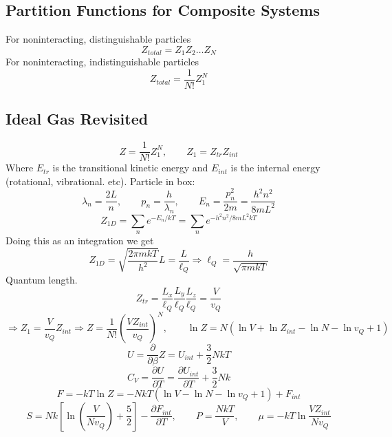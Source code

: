 \documentclass[a4paper,norsk, 10pt]{article}
\begin{document}
\subsection{Partition Functions for Composite Systems}
For noninteracting, distinguishable particles
\begin{equation}
Z_{total} = Z_1Z_2\ldots Z_N
\end{equation}
For noninteracting, indistinguishable particles
\begin{equation}
Z_{total} =\frac{1}{N!} Z_1^N
\end{equation}

\subsection{Ideal Gas Revisited}
\begin{equation}
Z =\frac{1}{N!} Z_1^N, \qquad Z_1 = Z_{tr}Z_{int}
\end{equation}
Where $E_{tr}$ is the transitional kinetic energy and $E_{int}$ is the internal energy (rotational, vibrational. etc). Particle in box:
\begin{equation}
\lambda_n = \frac{2L}{n}, \qquad p_n = \frac{h}{\lambda_n},\qquad E_n = \frac{p_n^2}{2m} = \frac{h^2n^2}{8mL^2}
\end{equation}
\begin{equation}
Z_{1D} = \sum_ne^{-E_n/kT} = \sum_n e^{-h^2n^2/8mL^2kT}
\end{equation}
Doing this as an integration we get
\begin{equation}
Z_{1D} = \sqrt{\frac{2\pi mk T}{h^2}}L = \frac{L}{\ell_Q} \Rightarrow \ell_Q = \frac{h}{\sqrt{\pi mkT}} 
\end{equation}
Quantum length.
\begin{equation}
Z_{tr} = \frac{L_x}{\ell_Q}\frac{L_y}{\ell_Q}\frac{L_z}{\ell_Q} = \frac{V}{v_Q}
\end{equation}
\begin{equation}
\Rightarrow Z_1 = \frac{V}{v_Q}Z_{int}\Rightarrow Z = \frac{1}{N!}\left(\frac{VZ_{int}}{v_Q}\right)^N,\qquad \ln Z = N( \ln V + \ln Z_{int} - \ln N - \ln v_Q + 1)
\end{equation}
\begin{equation}
U = \frac{\partial}{\partial \beta} Z =  U_{int} + \frac{3}{2}NkT 
\end{equation}
\begin{equation}
C_V = \frac{\partial U}{\partial T} = \frac{\partial U_{int}}{\partial T} + \frac{3}{2}Nk
\end{equation}
\begin{equation}
F = -kT\ln Z = -NkT(\ln V - \ln N - \ln v_Q + 1) + F_{int}
\end{equation}
\begin{equation}
S = Nk\left[\ln \left(\frac{V}{Nv_Q}\right) + \frac{5}{2}\right] - \frac{\partial F_{int}}{\partial T}, \qquad P = \frac{NkT}{V},\qquad \mu = -kT\ln \frac{V Z_{int}}{Nv_Q}
\end{equation}
\end{document}
